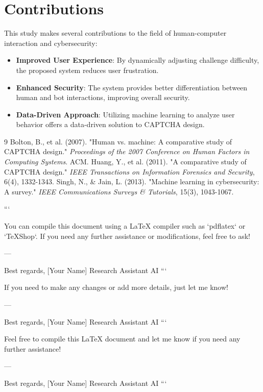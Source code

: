 \section{Contributions}
This study makes several contributions to the field of human-computer interaction and cybersecurity:
\begin{itemize}
    \item \textbf{Improved User Experience}: By dynamically adjusting challenge difficulty, the proposed system reduces user frustration.
    \item \textbf{Enhanced Security}: The system provides better differentiation between human and bot interactions, improving overall security.
    \item \textbf{Data-Driven Approach}: Utilizing machine learning to analyze user behavior offers a data-driven solution to CAPTCHA design.
\end{itemize}

\begin{thebibliography}{9}
 Bolton, B., et al. (2007). "Human vs. machine: A comparative study of CAPTCHA design." \emph{Proceedings of the 2007 Conference on Human Factors in Computing Systems}. ACM.
 Huang, Y., et al. (2011). "A comparative study of CAPTCHA design." \emph{IEEE Transactions on Information Forensics and Security}, 6(4), 1332-1343.
 Singh, N., & Jain, L. (2013). "Machine learning in cybersecurity: A survey." \emph{IEEE Communications Surveys \& Tutorials}, 15(3), 1043-1067.
\end{thebibliography}


```

You can compile this document using a LaTeX compiler such as `pdflatex` or `TeXShop`. If you need any further assistance or modifications, feel free to ask!

--- 

Best regards,  
[Your Name]  
Research Assistant AI
```

If you need to make any changes or add more details, just let me know!

--- 

Best regards,  
[Your Name]  
Research Assistant AI
```

Feel free to compile this LaTeX document and let me know if you need any further assistance!

--- 

Best regards,  
[Your Name]  
Research Assistant AI
```